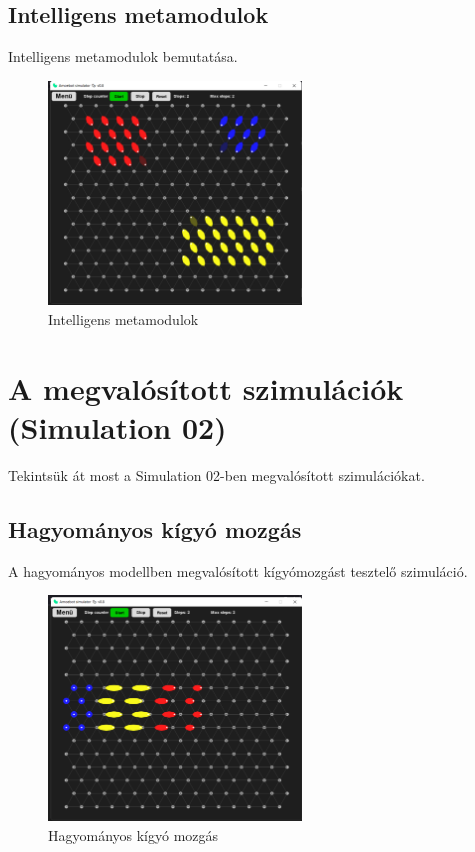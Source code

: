 \documentclass[	
  noindent
]{elteikthesis}[2024/04/26]
\begin{document}
      \subsection{Intelligens metamodulok}
        Intelligens metamodulok bemutatása.
      \begin{figure}[H]
      \centering
      \includegraphics[width=0.6\textwidth]{images/simulatons/06_meta.png}
      \caption{Intelligens metamodulok}
      \label{fig:06_meta}
      \end{figure}

    \section{A megvalósított szimulációk (Simulation 02)}
      Tekintsük át most a Simulation 02-ben megvalósított szimulációkat.

      \subsection{Hagyományos kígyó mozgás}
        A hagyományos modellben megvalósított kígyómozgást tesztelő szimuláció.
      \begin{figure}[H]
      \centering
      \includegraphics[width=0.6\textwidth]{images/simulatons/07_snake.png}
      \caption{Hagyományos kígyó mozgás}
      \label{fig:07_snake}
      \end{figure}
\end{document}
